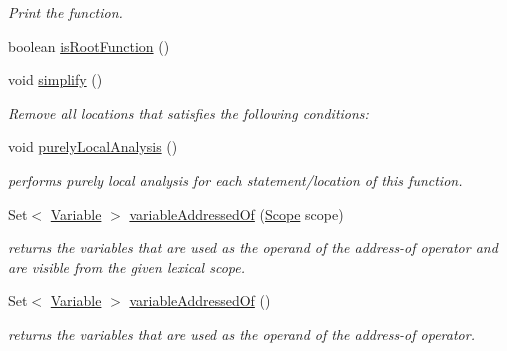 \begin{DoxyCompactItemize}
\begin{DoxyCompactList}\small\item\em Print the function. \end{DoxyCompactList}\item 
boolean \hyperlink{interfaceedu_1_1udel_1_1cis_1_1vsl_1_1civl_1_1model_1_1IF_1_1CIVLFunction_a3c299c18ba8fa83fef5e261fcead1e2f}{is\+Root\+Function} ()
\item 
void \hyperlink{interfaceedu_1_1udel_1_1cis_1_1vsl_1_1civl_1_1model_1_1IF_1_1CIVLFunction_a1458c908784dc7a5239d364ae13d6de7}{simplify} ()
\begin{DoxyCompactList}\small\item\em Remove all locations that satisfies the following conditions\+: \end{DoxyCompactList}\item 
void \hyperlink{interfaceedu_1_1udel_1_1cis_1_1vsl_1_1civl_1_1model_1_1IF_1_1CIVLFunction_a887555f816e05c1c33a26fdf947dfd9c}{purely\+Local\+Analysis} ()
\begin{DoxyCompactList}\small\item\em performs purely local analysis for each statement/location of this function. \end{DoxyCompactList}\item 
Set$<$ \hyperlink{interfaceedu_1_1udel_1_1cis_1_1vsl_1_1civl_1_1model_1_1IF_1_1variable_1_1Variable}{Variable} $>$ \hyperlink{interfaceedu_1_1udel_1_1cis_1_1vsl_1_1civl_1_1model_1_1IF_1_1CIVLFunction_aaba9ca031fa51eeec0e64365bf61c61f}{variable\+Addressed\+Of} (\hyperlink{interfaceedu_1_1udel_1_1cis_1_1vsl_1_1civl_1_1model_1_1IF_1_1Scope}{Scope} scope)
\begin{DoxyCompactList}\small\item\em returns the variables that are used as the operand of the address-\/of operator and are visible from the given lexical scope. \end{DoxyCompactList}\item 
Set$<$ \hyperlink{interfaceedu_1_1udel_1_1cis_1_1vsl_1_1civl_1_1model_1_1IF_1_1variable_1_1Variable}{Variable} $>$ \hyperlink{interfaceedu_1_1udel_1_1cis_1_1vsl_1_1civl_1_1model_1_1IF_1_1CIVLFunction_af3e7c1c5d42f41a1f7ad808302251e12}{variable\+Addressed\+Of} ()
\begin{DoxyCompactList}\small\item\em returns the variables that are used as the operand of the address-\/of operator. \end{DoxyCompactList}\item 

\end{DoxyCompactItemize}
